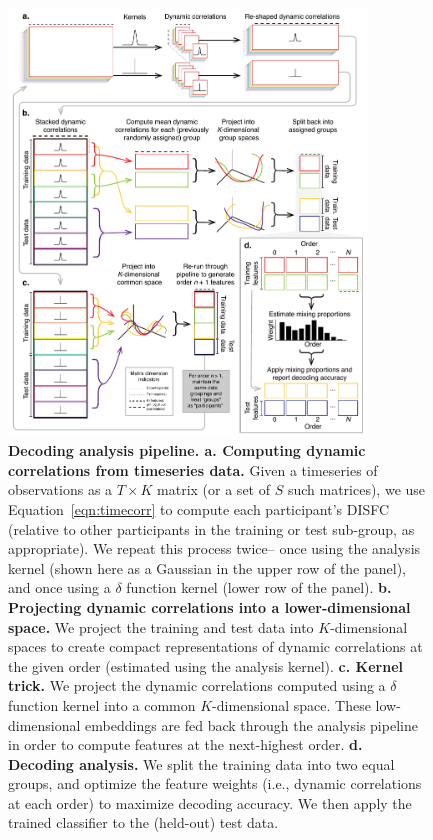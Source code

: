 \documentclass[english]{article}
\begin{document}
\begin{figure}
[tp]
  \centering
  \includegraphics[width=0.85\textwidth]{figs/timecorr_pipeline}
  \caption{\textbf{Decoding analysis pipeline.  a. Computing dynamic
       correlations from timeseries data.}  Given a timeseries of
    observations as a $T \times K$ matrix (or a set of $S$ such
    matrices), we use Equation~\ref{eqn:timecorr} to compute each
    participant's DISFC (relative to other participants in the
    training or test sub-group, as appropriate). We repeat this
    process twice-- once using the analysis kernel (shown here as a
    Gaussian in the upper row of the panel), and once using a $\delta$
    function kernel (lower row of the panel).
    \textbf{b. Projecting
       dynamic correlations into a lower-dimensional space.}  We
    project the training and test data into $K$-dimensional spaces to
    create compact representations of dynamic correlations at the
    given order (estimated using the analysis kernel).
   \textbf{c.  Kernel trick.}  We project the dynamic correlations
    computed using a $\delta$ function kernel into a common
    $K$-dimensional space.  These low-dimensional embeddings are fed
    back through the analysis pipeline in order to compute features at
    the next-highest order. \textbf{d. Decoding analysis.}  We split
    the training data into two equal groups, and optimize the feature
    weights (i.e., dynamic correlations at each order) to maximize
    decoding accuracy.  We then apply the trained classifier to the
    (held-out) test data.
  \label{fig:pipeline}}

\end{figure}
\end{document}
